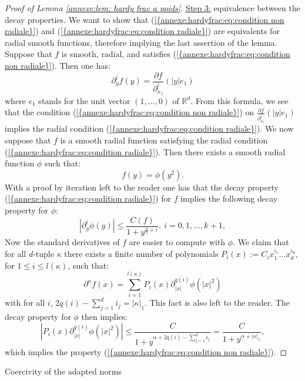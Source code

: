 \documentclass[11pt,a4paper,reqno]{amsart}
\theoremstyle{remark}
\numberwithin{equation}{section}
\begin{document}
\begin{appendix}
\begin{proof}[Proof of Lemma \ref{annexe:lem: hardy frac a poids}]
 \underline{Step 3:} equivalence between the decay properties. We want to show that  {{\rm (\ref{{annexe:hardyfrac:eq:condition non radiale}})}} and {{\rm (\ref{{annexe:hardyfrac:eq:condition radiale}})}} are equivalents for radial smooth functions, therefore implying the last assertion of the lemma. Suppose that $f$ is smooth, radial, and satisfies  {{\rm (\ref{{annexe:hardyfrac:eq:condition non radiale}})}}. Then one has:
$$
\partial_y^{i} f(y)= \frac{\partial f}{\partial^{i}_{x_1}}(|y|e_1)
$$
where $e_1$ stands for the unit vector $(1,...,0)$ of $\mathbb{R}^d$. From this formula, we see that the condition {{\rm (\ref{{annexe:hardyfrac:eq:condition non radiale}})}} on $\frac{\partial f}{\partial^{i}_{x_1}}(|y|e_1) $ implies the radial condition {{\rm (\ref{{annexe:hardyfrac:eq:condition radiale}})}}. We now suppose that $f$ is a smooth radial function satisfying the radial condition {{\rm (\ref{{annexe:hardyfrac:eq:condition radiale}})}}. Then there exists a smooth radial function $\phi$ such that:
$$
f(y)=\phi(y^2).
$$
With a proof by iteration left to the reader one has that the decay property {{\rm (\ref{{annexe:hardyfrac:eq:condition radiale}})}} for $f$ implies the following decay property for $\phi$:
$$
|\partial_y^i \phi(y)|\leq \frac{C(f)}{1+y^{\frac{\alpha}{2}+i}}, \ i=0,1,...,k+1,
$$
Now the standard derivatives of $f$ are easier to compute with $\phi$. We claim that for all $d$-tuple $\kappa$ there exists a finite number of polynomials $P_i(x):=C_ix_1^{i_1}...x_d^{i_d}$, for $1\leq i \leq l(\kappa)$, such that:
$$
\partial^{\kappa}f(x)= \sum_{i=1}^{l(\kappa)} P_i(x)\partial_{|x|}^{q(i)} \phi (|x|^2) 
$$
with for all $i$, $2q(i)-\sum_{j=1}^d i_j=|\kappa|_1$. This fact is also left to the reader. The decay property for $\phi $ then implies:
$$
|P_i(x)\partial_{|x|}^{q(i)} \phi (|x|^2) |\leq \frac{C}{1+y^{\alpha+2q(i)-\sum_{j=1}^{d}i_j}}= \frac{C}{1+y^{\alpha+|\kappa|_1}},
$$
which implies the property {{\rm (\ref{{annexe:hardyfrac:eq:condition non radiale}})}}.
\end{proof}

{  \z@{1.5\linespacing\@plus\linespacing}{.5\linespacing}  {\normalfont\bfseries\large\centering}}{Coercivity of the adapted norms}


\end{appendix}
\end{document}
